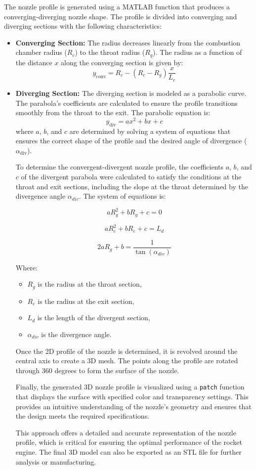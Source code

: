 The nozzle profile is generated using a MATLAB function that produces a converging-diverging nozzle shape. The profile is divided into converging and diverging sections with the following characteristics:

\begin{itemize}
    \item \textbf{Converging Section:} The radius decreases linearly from the combustion chamber radius (\(R_c\)) to the throat radius (\(R_g\)). The radius as a function of the distance \(x\) along the converging section is given by:
    \[
    y_{\text{conv}} = R_c - \left( R_c - R_g \right) \frac{x}{L_c}
    \]

    \item \textbf{Diverging Section:} The diverging section is modeled as a parabolic curve. The parabola's coefficients are calculated to ensure the profile transitions smoothly from the throat to the exit. The parabolic equation is:
    \[
    y_{\text{div}} = a x^2 + b x + c
    \]
    where \(a\), \(b\), and \(c\) are determined by solving a system of equations that ensures the correct shape of the profile and the desired angle of divergence (\(\alpha_{\text{div}}\)).


To determine the convergent-divergent nozzle profile, the coefficients \(a\), \(b\), and \(c\) of the divergent parabola were calculated to satisfy the conditions at the throat and exit sections, including the slope at the throat determined by the divergence angle \(\alpha_{div}\). The system of equations is:

\[
a R_g^2 + b R_g + c = 0
\]

\[
a R_e^2 + b R_e + c = L_d
\]

\[
2a R_g + b = \frac{1}{\tan(\alpha_{div})}
\]

Where:
\begin{itemize}
    \item \(R_g\) is the radius at the throat section,
    \item \(R_e\) is the radius at the exit section,
    \item \(L_d\) is the length of the divergent section,
    \item \(\alpha_{div}\) is the divergence angle.
\end{itemize}


Once the 2D profile of the nozzle is determined, it is revolved around the central axis to create a 3D mesh. The points along the profile are rotated through 360 degrees to form the surface of the nozzle.

Finally, the generated 3D nozzle profile is visualized using a \texttt{patch} function that displays the surface with specified color and transparency settings. This provides an intuitive understanding of the nozzle's geometry and ensures that the design meets the required specifications.

This approach offers a detailed and accurate representation of the nozzle profile, which is critical for ensuring the optimal performance of the rocket engine. The final 3D model can also be exported as an STL file for further analysis or manufacturing.

\end{itemize}


